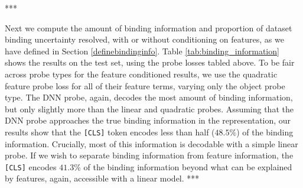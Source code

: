 \documentclass{article}
\theoremstyle{plain}
\theoremstyle{definition}
\theoremstyle{remark}
\begin{document}
\begin{table}[H]
\centering
\caption{\textbf{Comparison of quadratic object code probes with and without parameter reuse.} We report error reduction (ER) relative to the trivial majority-label baseline, which achieves $71.9\%$ accuracy for object codes. Numbers in parentheses denote the number of parameters relative to the linear probe.}
\label{tab:weight_sharing_ablation}
\end{table}
***

Next we compute the amount of binding information and proportion of dataset binding uncertainty resolved, with or without conditioning on features, as we have defined in Section \ref{definebindinginfo}. Table \ref{tab:binding_information} shows the results on the test set, using the probe losses tabled above. To be fair across probe types for the feature conditioned results, we use the quadratic feature probe loss for all of their feature terms, varying only the object probe type. The DNN probe, again, decodes the most amount of binding information, but only slightly more than the linear and quadratic probes. Assuming that the DNN probe approaches the true binding information in the representation, our results show that the \texttt{[CLS]} token encodes less than half ($48.5\%$) of the binding information. Crucially, most of this information is decodable with a simple linear probe. If we wish to separate binding information from feature information, the \texttt{[CLS]} encodes $41.3\%$ of the binding information beyond what can be explained by features, again, accessible with a linear model.
***
\end{document}
